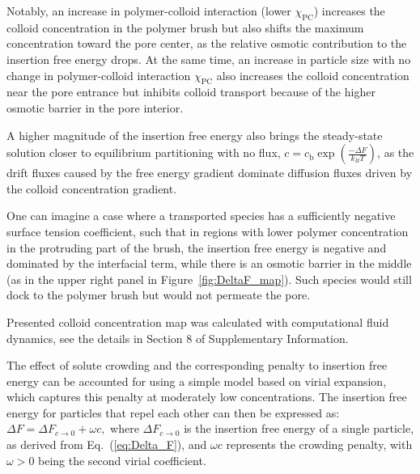\documentclass[12pt, a4paper]{article}
\newcommand\todo[1]{\textcolor{red}{#1}}
\begin{document}
Notably, an increase in polymer-colloid interaction (lower $\chi_{\text{PC}}$) increases the colloid concentration in the polymer brush but also shifts the maximum concentration toward the pore center, as the relative osmotic contribution to the insertion free energy drops.
At the same time, an increase in particle size with no change in polymer-colloid interaction $\chi_{\text{PC}}$ also increases the colloid concentration near the pore entrance but inhibits colloid transport because of the higher osmotic barrier in the pore interior.

A higher magnitude of the insertion free energy also brings the steady-state solution closer to equilibrium partitioning with no flux, $c = c_{\text{b}} \exp\left( \frac{-\Delta F}{k_B T} \right)$, as the drift fluxes caused by the free energy gradient dominate diffusion fluxes driven by the colloid concentration gradient.

One can imagine a case where a transported species has a sufficiently negative surface tension coefficient, such that in regions with lower polymer concentration in the protruding part of the brush, the insertion free energy is negative and dominated by the interfacial term, while there is an osmotic barrier in the middle (as in the upper right panel in Figure~\ref{fig:DeltaF_map}).
Such species would still dock to the polymer brush but would not permeate the pore.


Presented colloid concentration map was calculated with computational fluid dynamics, see the details in 
Section 8 of Supplementary Information.


The effect of solute crowding and the corresponding penalty to insertion free energy can be accounted for using a simple model based on virial expansion, which captures this penalty at moderately low concentrations.
The insertion free energy for particles that repel each other can then be expressed as:
$
    \Delta F = \Delta F_{c \to 0} + \omega c,
$
where $\Delta F_{c \to 0}$ is the insertion free energy of a single particle, as derived from Eq.~(\ref{eq:Delta_F}), and $\omega c$ represents the crowding penalty, with $\omega > 0$ being the second virial coefficient.
\end{document}
